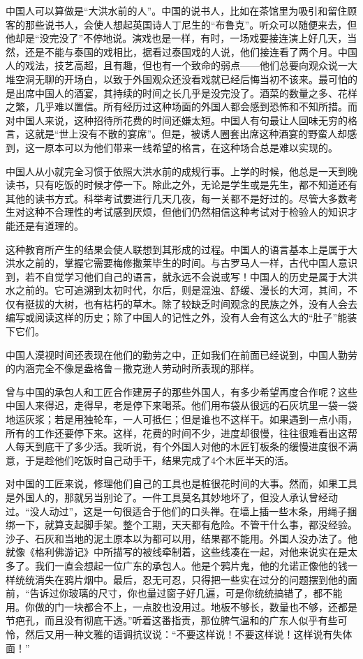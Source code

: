 \documentclass[12pt,oneside]{book}
\begin{document}
\begin{common-format}
中国人可以算做是“大洪水前的人”。中国的说书人，比如在茶馆里为吸引和留住顾客的那些说书人，会使人想起英国诗人丁尼生的“布鲁克”。听众可以随便来去，但他却是“没完没了”不停地说。演戏也是一样，有时，一场戏要接连演上好几天，当然，还是不能与泰国的戏相比，据看过泰国戏的人说，他们接连看了两个月。中国人的戏法，技艺高超，且有趣，但也有一个致命的弱点——他们总要向观众说一大堆空洞无聊的开场白，以致于外国观众还没看戏就已经后悔当初不该来。最可怕的是出席中国人的酒宴，其持续的时间之长几乎是没完没了。酒菜的数量之多、花样之繁，几乎难以置信。所有经历过这种场面的外国人都会感到恐怖和不知所措。而对中国人来说，这种招待所花费的时间还嫌太短。中国人有句最让人回味无穷的格言，这就是“世上没有不散的宴席”。但是，被诱人圈套出席这种酒宴的野蛮人却感到，这一原本可以为他们带来一线希望的格言，在这种场合总是难以实现的。

中国人从小就完全习惯于依照大洪水前的成规行事。上学的时候，他总是一天到晚读书，只有吃饭的时候才停一下。除此之外，无论是学生或是先生，都不知道还有其他的读书方式。科举考试要进行几天几夜，每一关都不是好过的。尽管大多数考生对这种不合理性的考试感到厌烦，但他们仍然相信这种考试对于检验人的知识才能还是有道理的。 

这种教育所产生的结果会使人联想到其形成的过程。中国人的语言基本上是属于大洪水之前的，掌握它需要梅修撒莱毕生的时间。与古罗马人一样，古代中国人意识到，若不自觉学习他们自己的语言，就永远不会说或写！中国人的历史是属于大洪水之前的。它可追溯到太初时代，尔后，则是混浊、舒缓、漫长的大河，其间，不仅有挺拔的大树，也有枯朽的草木。除了较缺乏时间观念的民族之外，没有人会去编写或阅读这样的历史；除了中国人的记性之外，没有人会有这么大的“肚子”能装下它们。 

中国人漠视时间还表现在他们的勤劳之中，正如我们在前面已经说到，中国人勤劳的内涵完全不像是盎格鲁－撒克逊人劳动时所表现的那样。 

曾与中国的承包人和工匠合作建房子的那些外国人，有多少希望再度合作呢？这些中国人来得迟，走得早，老是停下来喝茶。他们用布袋从很远的石灰坑里一袋一袋地运灰浆；若是用独轮车，一人可抵仨；但是谁也不这样干。如果遇到一点小雨，所有的工作还要停下来。这样，花费的时间不少，进度却很慢，往往很难看出这帮人每天到底干了多少活。我听说，有个外国人对他的木匠钉板条的缓慢进度很不满意，于是趁他们吃饭时自己动手干，结果完成了4个木匠半天的活。 

对中国的工匠来说，修理他们自己的工具也是桩很花时间的大事。然而，如果工具是外国人的，那就另当别论了。一件工具莫名其妙地坏了，但没人承认曾经动过。“没人动过”，这是一句很适合于他们的口头禅。在墙上插一些木条，用绳子捆绑一下，就算支起脚手架。整个工期，天天都有危险。不管干什么事，都没经验。沙子、石灰和当地的泥土原本以为都可以用，结果都不能用。外国人没办法了。他就像《格利佛游记》中所描写的被线牵制着，这些线凑在一起，对他来说实在是太多了。我们一直会想起一位广东的承包人。他是个鸦片鬼，他的允诺正像他的钱一样统统消失在鸦片烟中。最后，忍无可忍，只得把一些实在过分的问题摆到他的面前，“告诉过你玻璃的尺寸，你也量过窗子好几遍，可是你统统搞错了，都不能用。你做的门一块都合不上，一点胶也没用过。地板不够长，数量也不够，还都是节疤孔，而且没有彻底干透。”听着这番指责，那位脾气温和的广东人似乎有些可怜，然后又用一种文雅的语调抗议说：“不要这样说！不要这样说！这样说有失体面！” 


\end{common-format}
\end{document}
